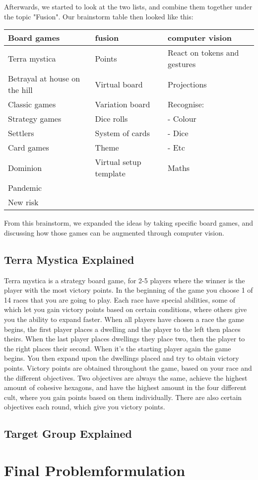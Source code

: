 Afterwards, we started to look at the two lists, and combine them together under the topic "Fusion". Our brainstorm table then looked like this:

\begin{tabular}{l | l | l}
Board games & fusion & computer vision\\
\hline
Terra mystica & Points & React on tokens and gestures\\
Betrayal at house on the hill &  Virtual board & Projections\\
Classic games & Variation board & Recognise: \\
Strategy games & Dice rolls & - Colour\\
Settlers & System of cards & - Dice\\
Card games & Theme & - Etc\\
Dominion & Virtual setup template & Maths\\
Pandemic \\
New risk\\
\end{tabular}

From this brainstorm, we expanded the ideas by taking specific board games, and discussing how those games can be augmented through computer vision.
\subsection{Terra Mystica Explained}
Terra mystica is a strategy board game, for 2-5 players where the winner is the player with the most victory points. In the beginning of the game you choose 1 of 14 races that you are going to play. Each race have special abilities, some of which let you gain victory points based on certain conditions, where others give you the ability to expand faster. When all players have chosen a race the game begins, the first player places a dwelling and the player to the left then places theirs. When the last player places dwellings they place two, then the player to the right places their second. When it's the starting player again the game begins. You then expand upon the dwellings placed and try to obtain victory points. Victory points are obtained throughout the game, based on your race and the different objectives. Two objectives are always the same, achieve the highest amount of cohesive hexagons, and have the highest amount in the four different cult, where you gain points based on them individually. There are also certain objectives each round, which give you victory points. 

 
\subsection{Target Group Explained}

\section{Final Problemformulation}\label{sec:finalprob}